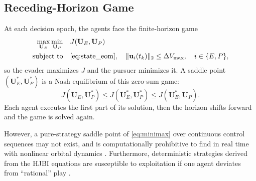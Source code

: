
\subsection{Receding-Horizon Game}

At each decision epoch, the agents face the finite-horizon game
%
\begin{equation}
    \begin{aligned}
    \max_{\mathbf{U}_E} \min_{\mathbf{U}_P} \quad & J(\mathbf{U}_E, \mathbf{U}_P) \\
    \text{subject to} \quad & \eqref{eq:state_eom}, \quad \|\mathbf{u}_i(t_k)\|_2 \leq \Delta V_{\max}, \quad i \in \{E, P\},
    \label{eq:minimax}
    \end{aligned}
\end{equation}
%
so the evader maximizes $J$ and the pursuer minimizes it. A saddle point $(\mathbf{U}_E^*, \mathbf{U}_P^*)$ is a Nash equilibrium of this zero-sum game:
%
\begin{equation}
J(\mathbf{U}_E, \mathbf{U}_P^*) \leq J(\mathbf{U}_E^*, \mathbf{U}_P^*) \leq J(\mathbf{U}_E^*, \mathbf{U}_P) .
\end{equation}
%
Each agent executes the first part of its solution, then the horizon shifts forward and the game is solved again.


However, a pure-strategy saddle point of \eqref{eq:minimax} over continuous control sequences may not exist, and is computationally prohibitive to find in real time with nonlinear orbital dynamics \cite{jia_approximate_2025}. Furthermore, deterministic strategies derived from the HJBI equations are susceptible to exploitation if one agent deviates from ``rational'' play \cite{krusniak_mixed_2025}.
